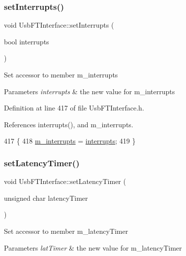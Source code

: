 \subsubsection{\texorpdfstring{set\+Interrupts()}{setInterrupts()}}
{\footnotesize\ttfamily void Usb\+F\+T\+Interface\+::set\+Interrupts (\begin{DoxyParamCaption}\item[{bool}]{interrupts }\end{DoxyParamCaption})\hspace{0.3cm}{\ttfamily [inline]}}

Set accessor to member m\+\_\+interrupts 
\begin{DoxyParams}{Parameters}
{\em interrupts} & the new value for m\+\_\+interrupts \\
\hline
\end{DoxyParams}


Definition at line 417 of file Usb\+F\+T\+Interface.\+h.



References interrupts(), and m\+\_\+interrupts.


\begin{DoxyCode}
417                                        \{
418     \hyperlink{classUsbFTInterface_a0a6e3a781ead9833a413e230c6f8d1f4}{m\_interrupts} = \hyperlink{classUsbFTInterface_a1831ba02d9707ded902af4cb1df8863f}{interrupts};
419   \}
\end{DoxyCode}
\mbox{\label{classUsbFTInterface_abe0147f74ac414d0bd2cb4a7a81024b9}} 
\subsubsection{\texorpdfstring{set\+Latency\+Timer()}{setLatencyTimer()}}
{\footnotesize\ttfamily void Usb\+F\+T\+Interface\+::set\+Latency\+Timer (\begin{DoxyParamCaption}\item[{unsigned char}]{latency\+Timer }\end{DoxyParamCaption})\hspace{0.3cm}{\ttfamily [inline]}}

Set accessor to member m\+\_\+latency\+Timer 
\begin{DoxyParams}{Parameters}
{\em lat\+Timer} & the new value for m\+\_\+latency\+Timer \\
\hline
\end{DoxyParams}



